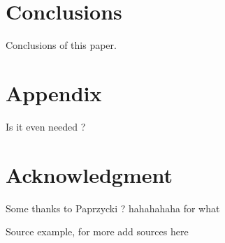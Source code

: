 \documentclass[conference]{IEEEtran}
\begin{document}
\section{Conclusions}
Conclusions of this paper.











\balance




\section*{Appendix}
Is it even needed ?

\section*{Acknowledgment}
Some thanks to Paprzycki ? hahahahaha for what


\begin{thebibliography}{99}

Source example, for more add sources here

\end{thebibliography}
\end{document}
